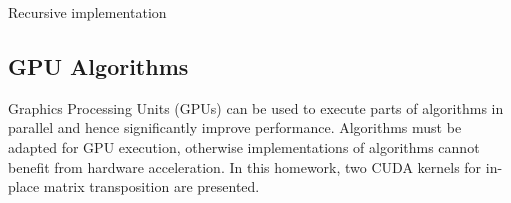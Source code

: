 \documentclass[conference]{IEEEtran}
\begin{document}
    \begin{algorithm}
        \BlankLine
        \caption{Recursive implementation}
        \label{fig:rec_implementation}        
    \end{algorithm}

    \subsection{GPU Algorithms}
    Graphics Processing Units (GPUs) can be used to execute parts of algorithms in parallel and hence significantly improve performance. Algorithms must be adapted for GPU execution, otherwise implementations of algorithms cannot benefit from hardware acceleration. In this homework, two CUDA kernels for in-place matrix transposition are presented. 
\end{document}
